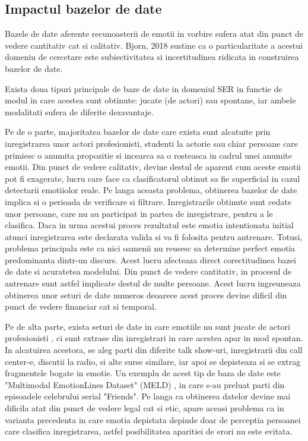 \documentclass[a4paper,12pt]{book}
\begin{document}
				\subsection{Impactul bazelor de date}
					Bazele de date aferente recunoasterii de emotii in vorbire sufera atat din punct de vedere cantitativ cat si calitativ. Bjorn, 2018 \cite{bjorn1} sustine ca o particularitate a acestui domeniu de cercetare este subiectivitatea si incertitudinea ridicata in construirea bazelor de date. \par 
					Exista doua tipuri principale de baze de date in domeniul SER in functie de modul in care acestea sunt obtinute: jucate (de actori) sau spontane, iar ambele modalitati sufera de diferite dezavantaje. \par
					Pe de o parte, majoritatea bazelor de date care exista sunt alcatuite prin inregistrarea unor actori profesionisti, studenti la actorie sau chiar persoane care primiesc o anumita propozitie si incearca sa o rosteasca in cadrul unei anumite emotii. Din punct de vedere calitativ, devine destul de aparent cum aceste emotii pot fi exagerate, lucru care face ca clasificatorul obtinut sa fie superficial in cazul detectarii emotiiolor reale. Pe langa aceasta problema, obtinerea bazelor de date implica si o perioada de verificare si filtrare. Inregistrarile obtinute sunt cedate unor persoane, care nu au participat in partea de inregistrare, pentru a le clasifica. Daca in urma acestui proces rezultatul este emotia intentionata initial atunci inregistrarea este declarata valida si va fi folosita pentru antrenare. Totusi, problema principala este ca nici oamenii nu reusesc sa determine perfect emotia predominanta dintr-un discurs. Acest lucru afecteaza direct corectitudinea bazei de date si acuratetea modelului. Din punct de vedere cantitativ, in procesul de antrenare sunt astfel implicate destul de multe persoane. Acest lucru ingreuneaza obtinerea unor seturi de date numeros deoarece acest proces devine dificil din punct de vedere financiar cat si temporal.\par
					Pe de alta parte, exista seturi de date in care emotiile nu sunt jucate de actori profesionisti , ci sunt extrase din inregistrari in care acestea apar in mod spontan. In alcatuirea acestora, se aleg parti din diferite talk show-uri, inregistrarii din call center-e, discutii la radio, si alte surse similare, iar apoi se depisteaza si se extrag fragmentele bogate in emotie. Un exemplu de acest tip de baza de date este "Multimodal EmotionLines Dataset" (MELD) \cite{meld}, in care s-au preluat parti din episoadele celebrului serial "Friends". Pe langa ca obtinerea datelor devine mai dificila atat din punct de vedere legal cat si etic, apare aceasi problema ca in varianta precedenta in care emotia depistata depinde doar de perceptia persoanei care clasifica inregistrarea, astfel posibilitatea aparitiei de erori nu este evitata. \par
\end{document}
